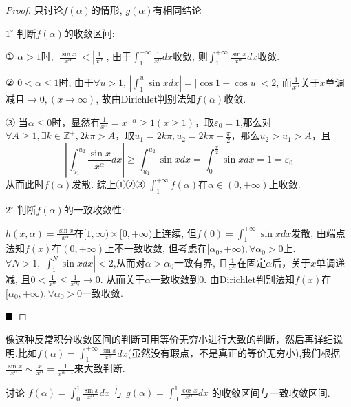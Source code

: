 \documentclass[lang=cn,newtx,10pt,scheme=chinese]{elegantbook}
\begin{document}
\begin{proof}
只讨论$f(\alpha)$的情形, $g(\alpha)$有相同结论

    $1^{\circ}$ 判断$f(\alpha)$的收敛区间:

        ① $\alpha > 1$时, $\left|\frac{\sin x}{x^\alpha}\right| < \left|\frac{1}{x^\alpha}\right|$, 由于$\int_{1}^{+\infty} \frac{1}{x^\alpha} dx$收敛, 则$\int_{1}^{+\infty} \frac{\sin x}{x^\alpha} dx$收敛.
        
        ② $0 < \alpha \le 1$时, 由于$\forall u > 1$, $\left|\int_{1}^{u} \sin x dx\right| = |\cos 1 - \cos u| < 2$, 而$\frac{1}{x^\alpha}$关于$x$单调减且$\to 0, (x \to \infty)$, 故由Dirichlet判别法知$f(\alpha)$收敛.
        
        ③ 当$\alpha \le 0$时，显然有$\frac{1}{x^{\alpha}} = x^{-\alpha} \ge 1(x\ge1)$，取$\varepsilon_0 = 1$,那么对$\forall A \ge 1,\exists k \in \mathbb Z ^+,2k\pi>A$，取$u_1 =2k \pi,u_2=2k \pi +\frac \pi 2$，那么$u_2>u_1>A$，且
$$
|\int_{u_1}^{u_2}\frac{\sin x }{x^{\alpha}}dx|\ge \int_{u_1}^{u_2}\sin x dx = \int_0^{\frac \pi 2 }\sin xdx = 1=\varepsilon_0
$$
从而此时$f(\alpha)$发散.
    综上①②③ $\int_{1}^{+\infty} f(\alpha)$在$\alpha \in (0, +\infty)$上收敛.

    $2^{\circ}$ 判断$f(\alpha)$的一致收敛性:
    
    $h(x,\alpha) = \frac{\sin x}{x^{\alpha}}$在$[1, \infty) \times [0, +\infty)$上连续, 但$f(0)=\int_{1}^{+\infty} \sin x dx$发散, 由端点法知$f(x)$在$(0, +\infty)$上不一致收敛, 但考虑在$[\alpha_0, +\infty), \forall \alpha_0 > 0$上. $\forall N > 1, \left|\int_{1}^{N} \sin x dx\right| < 2$,从而对$\alpha > \alpha_0$一致有界, 且$\frac{1}{x^\alpha}$在固定$\alpha$后，关于$x$单调递减, 且$0 < \frac{1}{x^\alpha} \le \frac{1}{x^{\alpha_0}} \to 0$. 从而关于$\alpha$一致收敛到$0$.
    由Dirichlet判别法知$f(x)$在$[\alpha_0, +\infty), \forall \alpha_0 > 0$一致收敛.

$\hfill \blacksquare$
\end{proof}
\begin{note}
    像这种反常积分收敛区间的判断可用等价无穷小进行大致的判断，然后再详细说明.比如$f(\alpha) = \int_{1}^{+\infty} \frac{\sin x}{x^\alpha} dx$(虽然没有瑕点，不是真正的等价无穷小),我们根据$\frac{\sin x}{x^\alpha}  \sim \frac{x}{x^\alpha} = \frac{1}{x^{\alpha-1}}$来大致判断.
\end{note}

\begin{example}[$\bigstar$]{\label{ex13.2.14}}
讨论 $f(\alpha) = \int_{0}^{1} \frac{\sin x}{x^\alpha} dx$ 与 $g(\alpha) = \int_{0}^{1} \frac{\cos x}{x^\alpha} dx$ 的收敛区间与一致收敛区间.
\end{example}
\end{document}
